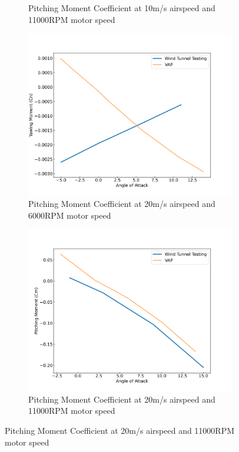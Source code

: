 \begin{figure}[H]
\begin{subfigure}[b]{0.467\textwidth}
        \caption{Pitching Moment Coefficient at 10m/s airspeed and 11000RPM motor speed}
        \label{fig:VAP_NoProp_Cm_10ms_11000}
    \end{subfigure}
    \begin{subfigure}[b]{0.467\textwidth}
        \centering
        \includegraphics[width=\textwidth]{05_Results/VAP/noProp/Cn/20ms_6000RPM_Cn.png}
        \caption{Pitching Moment Coefficient at 20m/s airspeed and 6000RPM motor speed}
        \label{fig:VAP_NoProp_Cm_20ms_6000}
    \end{subfigure}
    \begin{subfigure}[b]{0.467\textwidth}
        \centering
        \includegraphics[width=\textwidth]{05_Results/VAP/noProp/Cm/20ms_11000RPM_Cm.png}
        \caption{Pitching Moment Coefficient at 20m/s airspeed and 11000RPM motor speed}
        \label{fig:VAP_NoProp_Cm_20ms_11000}
    \end{subfigure}
\end{figure}




